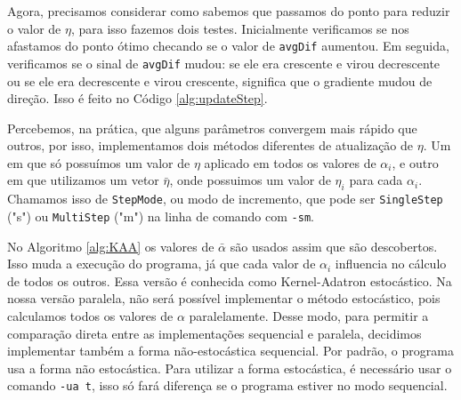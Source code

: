 Agora, precisamos considerar como sabemos que passamos do ponto para reduzir o valor de $\eta$, para isso fazemos dois testes. Inicialmente verificamos se nos afastamos do ponto ótimo checando se o valor de \texttt{avgDif} aumentou. Em seguida, verificamos se o sinal de \texttt{avgDif} mudou: se ele era crescente e virou decrescente ou se ele era decrescente e virou crescente, significa que o gradiente mudou de direção. Isso é feito no Código \ref{alg:updateStep}.


Percebemos, na prática, que alguns parâmetros convergem mais rápido que outros, por isso, implementamos dois métodos diferentes de atualização de $\eta$. Um em que só possuímos um valor de $\eta$ aplicado em todos os valores de $\alpha_i$, e outro em que utilizamos um vetor $\bar{\eta}$, onde possuimos um valor de $\eta_i$ para cada $\alpha_i$. Chamamos isso de \texttt{StepMode}, ou modo de incremento, que pode ser \texttt{SingleStep} ("s") ou \texttt{MultiStep} ("m") na linha de comando com \texttt{-sm}.

No Algoritmo \ref{alg:KAA} os valores de $\bar{\alpha}$ são usados assim que são descobertos. Isso muda a execução do programa, já que cada valor de $\alpha_i$ influencia no cálculo de todos os outros. Essa versão é conhecida como Kernel-Adatron estocástico. Na nossa versão paralela, não será possível implementar o método estocástico, pois calculamos todos os valores de $\alpha$ paralelamente.
Desse modo, para permitir a comparação direta entre as implementações sequencial e paralela, decidimos implementar também a forma não-estocástica sequencial.
Por padrão, o programa usa a forma não estocástica. Para utilizar a forma estocástica, é necessário usar o comando \texttt{-ua t}, isso só fará diferença se o programa estiver no modo sequencial.

